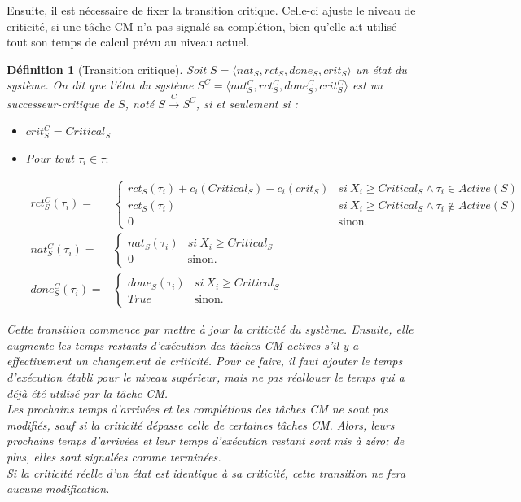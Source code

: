 \documentclass[12pt,a4paper,oneside]{book}
\theoremstyle{break}
\newtheorem{defin}{Définition}[chapter]
\theoremstyle{breakplain}
\begin{document}
Ensuite, il est nécessaire de fixer la transition critique. Celle-ci ajuste le niveau de criticité, si une tâche CM n'a pas signalé sa complétion, bien qu'elle ait utilisé tout son temps de calcul prévu au niveau actuel.\\

\pagebreak

\begin{defin}[Transition critique]
\label{spo:tcrit}
Soit $S = \langle nat_S, rct_S, done_S, crit_S \rangle$ un état du système. On dit que l'état du système $S^C = \langle nat_S^C, rct_S^C, done_S^C, crit_S^C \rangle$ est un \textit{successeur-critique} de $S$, noté $S\xrightarrow{C}S^C$, si et seulement si :

\begin{itemize}
\item $crit_S^C = Critical_S$
\item Pour tout $\tau_i \in \tau :$

\noindent $$
\begin{array}{rl}
rct_S^C(\tau_i) =  &\left\{
    \begin{array}{ll}
        rct_S(\tau_i)+c_i(Critical_S)-c_i(crit_S) & si\ X_i\geq Critical_S \wedge \tau_i \in Active(S)\\
        rct_S(\tau_i) & si\ X_i\geq Critical_S \wedge \tau_i \notin Active(S)\\
        0 & \mbox{sinon.}
    \end{array}
\right.\\
 nat_S^C(\tau_i) = &\left\{
    \begin{array}{ll}
        nat_S(\tau_i) & si\ X_i\geq Critical_S \\
        0 & \mbox{sinon.}
    \end{array}
\right.\\
 done_S^C(\tau_i) = &\left\{
    \begin{array}{ll}
        done_S(\tau_i) & si\ X_i\geq Critical_S \\
        True & \mbox{sinon.}
    \end{array}
\right.
\end{array}
$$
\end{itemize}

Cette transition commence par mettre à jour la criticité du système. Ensuite, elle augmente les temps restants d'exécution des tâches CM actives s'il y a effectivement un changement de criticité. Pour ce faire, il faut ajouter le temps d'exécution établi pour le niveau supérieur, mais ne pas réallouer le temps qui a déjà été utilisé par la tâche CM.\\

Les prochains temps d'arrivées et les complétions des tâches CM ne sont pas modifiés, sauf si la criticité dépasse celle de certaines tâches CM. Alors, leurs prochains temps d'arrivées et leur temps d'exécution restant sont mis à zéro; de plus, elles sont signalées comme terminées.\\ 

Si la criticité réelle d'un état est identique à sa criticité, cette transition ne fera aucune modification.
\end{defin}
\end{document}
